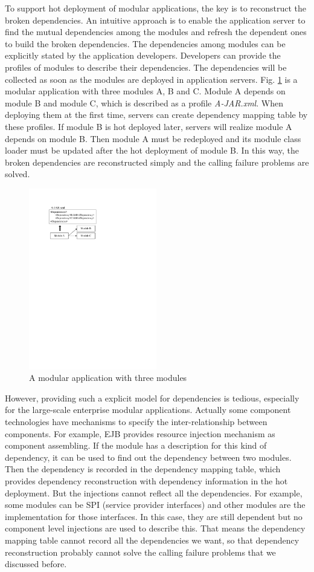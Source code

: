 \documentclass[conference]{IEEEtran}
\begin{document}
To support hot deployment of modular applications, the key is to reconstruct the broken dependencies. An intuitive approach is to enable the application server to find the mutual dependencies among the modules and refresh the dependent ones to build the broken dependencies. The dependencies among modules can be explicitly stated by the application developers. Developers can provide the profiles of modules to describe their dependencies. The dependencies will be collected as soon as the modules are deployed in application servers. Fig. \ref{fig:example_abc} is a modular application with three modules A, B and C. Module A depends on module B and module C, which is described as a profile \emph{A-JAR.xml}. When deploying them at the first time, servers can create dependency mapping table by these profiles. If module B is hot deployed later, servers will realize module A depends on module B. Then module A must be redeployed and its module class loader must be updated after the hot deployment of module B. In this way, the broken dependencies are reconstructed simply and the calling failure problems are solved.

\begin{figure}[ht]
\centering
\includegraphics[width=2.2in]{ExampleThree.pdf}
\caption{A modular application with three modules}
\label{fig:example_abc}
\end{figure}


However, providing such a explicit model for dependencies is tedious, especially for the large-scale enterprise modular applications. Actually some component technologies have mechanisms to specify the inter-relationship between components. For example, EJB provides resource injection mechanism\cite{DI} as component assembling. If the module has a description for this kind of dependency, it can be used to find out the dependency between two modules. Then the dependency is recorded in the dependency mapping table, which provides dependency reconstruction with dependency information in the hot deployment. But the injections cannot reflect all the dependencies. For example, some modules can be SPI (service provider interfaces) and other modules are the implementation for those interfaces. In this case, they are still dependent but no component level injections are used to describe this. That means the dependency mapping table cannot record all the dependencies we want, so that dependency reconstruction probably cannot solve the calling failure problems that we discussed before.
\end{document}
